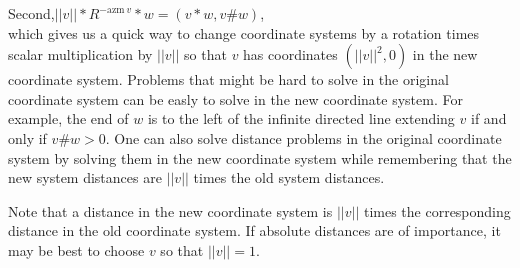 \documentclass[12pt]{article}
\begin{document}
Second,\hspace{0.5in}$||v||*R^{-\mathrm{azm}~v}*w=(v*w,v\#w)$,
\\[1ex]
which gives us a quick way to change coordinate systems
by a rotation times scalar multiplication by $||v||$ so that
$v$ has coordinates $(||v||^2,0)$ in the new coordinate system.
Problems that might be hard to solve in the original
coordinate system can be easly to solve in the new coordinate
system.  For example, the end of $w$ is to the left of the infinite directed
line extending $v$ if and only if $v\#w>0$.  One can also solve
distance problems in the original coordinate system by solving them
in the new coordinate system while remembering that the new system distances
are $||v||$ times the old system distances.

Note that a distance in
the new coordinate system is $||v||$ times the corresponding
distance in the old coordinate system.  If absolute distances are
of importance, it may be best to choose $v$ so that $||v||=1$.

\bigskip
\end{document}
